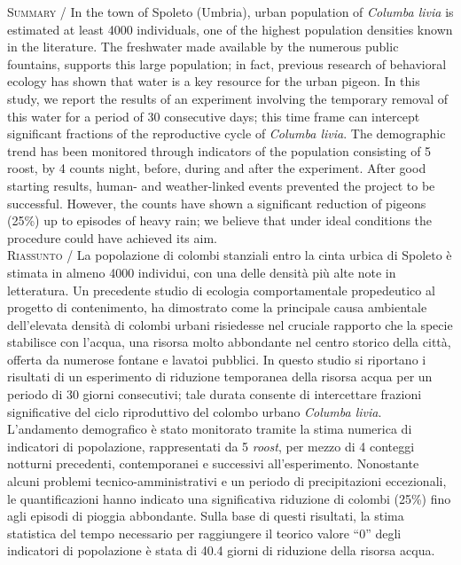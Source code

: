 {\small
\noindent \textsc{\color{MUSEBLUE} Summary} / In the town of Spoleto (Umbria), urban population of \textit{Columba
livia }is estimated at least 4000 individuals, one of the highest
population densities known in the literature.
The freshwater made available by the numerous public fountains, supports
this large population; in fact, previous research of behavioral ecology
has shown that water is a key resource for the urban pigeon. In this
study, we report the results of an experiment involving the temporary
removal of this water for a period of 30 consecutive days; this time
frame can intercept significant fractions of the reproductive cycle of
\textit{Columba livia}. The demographic trend has been monitored
through indicators of the population consisting of 5 roost, by 4 counts
night, before, during and after the experiment. After good starting
results, human- and  weather-linked events prevented the project to be
successful. However, the counts have shown a significant reduction of
pigeons (25\%) up to episodes of heavy rain; we believe that under
ideal conditions the procedure could have achieved its aim.  \\
\noindent \textsc{\color{MUSEBLUE} Riassunto} / La popolazione di colombi stanziali entro la cinta urbica di Spoleto \`e
stimata in almeno 4000 individui, con una delle densit\`a pi\`u alte
note in letteratura. Un precedente studio di ecologia comportamentale
propedeutico al progetto di contenimento, ha dimostrato come la
principale causa ambientale dell{\textquoteright}elevata densit\`a di
colombi urbani risiedesse nel cruciale rapporto che la specie
stabilisce con l{\textquoteright}acqua, una risorsa molto abbondante
nel centro storico della citt\`a, offerta da numerose fontane e lavatoi
pubblici. In questo studio si riportano i risultati di un esperimento
di riduzione temporanea della risorsa acqua per un periodo di 30 giorni
consecutivi; tale durata consente di intercettare frazioni
significative del ciclo riproduttivo del colombo urbano \textit{Columba
livia}. L{\textquoteright}andamento demografico \`e stato monitorato
tramite la stima numerica di indicatori di popolazione, rappresentati
da 5 \textit{roost}, per mezzo di 4 conteggi notturni precedenti,
contemporanei e successivi all{\textquoteright}esperimento. Nonostante
alcuni problemi tecnico-amministrativi e un periodo di precipitazioni
eccezionali, le quantificazioni hanno indicato una significativa
riduzione di colombi (25\%) fino agli episodi di pioggia abbondante.
Sulla base di questi risultati, la stima statistica del tempo
necessario per raggiungere il teorico valore
{\textquotedblleft}0{\textquotedblright} degli indicatori di
popolazione \`e stata di 40.4 giorni di riduzione della risorsa acqua. \\
}



